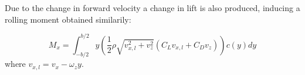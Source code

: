 Due to the change in forward velocity a change in lift is also produced, inducing a rolling moment obtained similarily:

\begin{equation}
	M_x = \int_{-b/2}^{b/2} y \left( \frac{1}{2} \rho \sqrt{v_{x,l}^2 + v_z^2} \left( C_L v_{x,l} + C_D v_{z} \right) \right) c(y) dy
\end{equation}
where $v_{x,l} = v_x - \omega_z y$.

